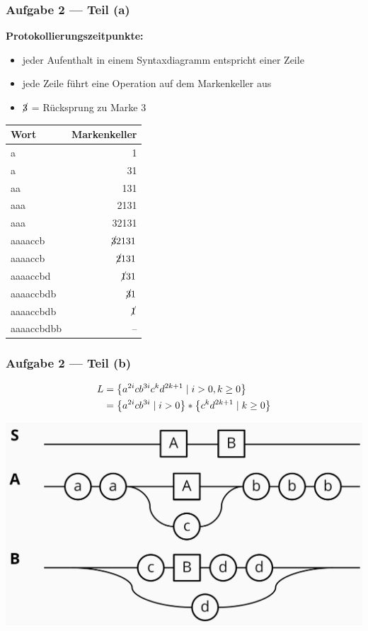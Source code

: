 \documentclass{beamer}
\begin{document}
\begin{frame} \frametitle{Aufgabe 2 --- Teil (a)}
	\begin{minipage}{\dimexpr0.5\linewidth-\fboxrule-\fboxsep}
		\small
		\textbf{Protokollierungszeitpunkte:}
		\begin{itemize}
			\item jeder Aufenthalt in einem Syntaxdiagramm entspricht einer Zeile
			\item jede Zeile führt eine Operation auf dem Markenkeller aus
			\item $\cancel{3}$ = Rücksprung zu Marke $3$
		\end{itemize}
	\end{minipage}
	\pause
	\begin{minipage}{\dimexpr0.5\linewidth-\fboxrule-\fboxsep}
		\centering
		\begin{tabular}{l|r}
			\hline
			Wort & Markenkeller \\ \hline \pause
			a & 1 \\ \pause
			a & 31 \\ \pause
			aa & 131 \\ \pause
			aaa & 2131 \\ \pause
			aaa & 32131 \\ \pause
			aaaaccb & $\cancel{3} 2131$ \\ \pause
			aaaaccb & $\cancel{2}131$ \\ \pause
			aaaaccbd & $\cancel{1}31$ \\ \pause
			aaaaccbdb & $\cancel{3}1$ \\ \pause
			aaaaccbdb & $\cancel{1}$ \\ \pause
			aaaaccbdbb & -- \\ \hline
		\end{tabular}
	\end{minipage}
\end{frame}

\begin{frame} \frametitle{Aufgabe 2 --- Teil (b)}
	\begin{align*}
		L &= \left\{ a^{2i} c b^{3i} c^k d^{2k+1} \mid i > 0, k \ge 0 \right\} \\
		&= \left\{ a^{2i} c b^{3i} \mid i > 0 \right\} * \left\{ c^k d^{2k+1} \mid k \ge 0 \right\}
	\end{align*}
	
	\centering
	\includegraphics[width=.9\textwidth]{tut02_syntax_dia_2a.jpg}
\end{frame}
\end{document}
